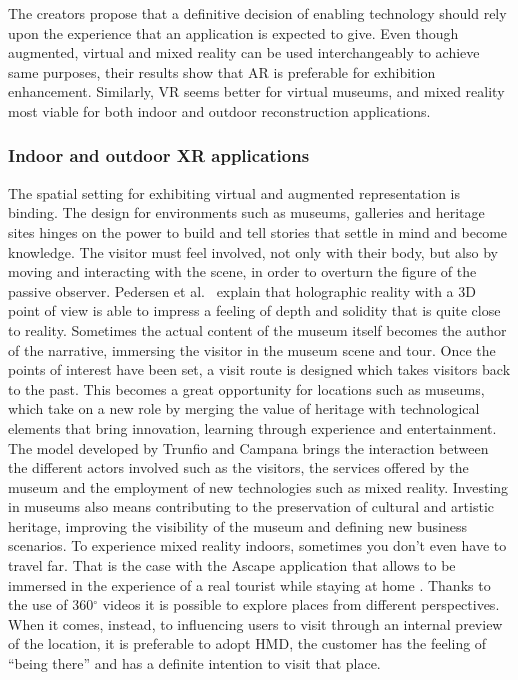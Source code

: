 The creators propose that a definitive decision of enabling technology should rely upon the experience that an application is expected to give. Even though augmented, virtual and mixed reality can be used interchangeably to achieve same purposes, their results show that AR is preferable for exhibition enhancement. Similarly, VR seems better for virtual museums, and mixed reality most viable for both indoor and outdoor reconstruction applications.

\subsubsection{Indoor and outdoor XR applications}

The spatial setting for exhibiting virtual and augmented representation is binding. The design for environments such as museums, galleries and heritage sites hinges on the power to build and tell stories that settle in mind and become knowledge. The visitor must feel involved, not only with their body, but also by moving and interacting with the scene, in order to overturn the figure of the passive observer. Pedersen et al.~\cite{pedersen_more_2017} explain that holographic reality with a 3D point of view is able to impress a feeling of depth and solidity that is quite close to reality. Sometimes the actual content of the museum itself becomes the author of the narrative, immersing the visitor in the museum scene and tour. Once the points of interest have been set, a visit route is designed which takes visitors back to the past. This becomes a great opportunity for locations such as museums, which take on a new role by merging the value of heritage with technological elements that bring innovation, learning through experience and entertainment. The model developed by Trunfio and Campana \cite{jung_augmented_2020} brings the interaction between the different actors involved such as the visitors, the services offered by the museum and the employment of new technologies such as mixed reality. Investing in museums also means contributing to the preservation of cultural and artistic heritage, improving the visibility of the museum and defining new business scenarios.
To experience mixed reality indoors, sometimes you don't even have to travel far. That is the case with the Ascape application that allows to be immersed in the experience of a real tourist while staying at home \cite{cranmer_understanding_2016}. Thanks to the use of 360$^{\circ}$ videos it is possible to explore places from different perspectives. When it comes, instead, to influencing users to visit through an internal preview of the location, it is preferable to adopt \gls{HMD}, the customer has the feeling of “being there” and has a definite intention to visit that place.

